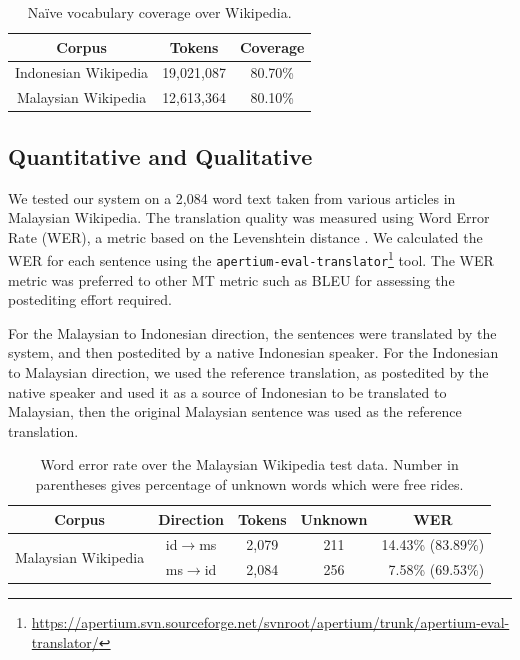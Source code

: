 \documentclass[10pt,a5paper,twoside]{article}
\begin{document}
\begin{table}[htbp]
  \begin{center}
  \begin{tabular}{ccc}
  \toprule
  \bf{Corpus} & \bf{Tokens} & \bf{Coverage}\\
  \midrule
  Indonesian Wikipedia & 19,021,087 & 80.70\% \\
  \midrule
  Malaysian Wikipedia & 12,613,364 & 80.10\% \\
  \bottomrule
  \end{tabular}
  \caption{Na\"ive vocabulary coverage over Wikipedia.}
  \label{table:coverage}
  \end{center}
\end{table}

\subsection{Quantitative and Qualitative}
We tested our system on a 2,084 word text taken from various articles in Malaysian Wikipedia. The translation quality was measured using Word Error Rate (WER), a metric based on the Levenshtein distance \citep{levenshtein/1966}. We calculated the WER for each sentence using the \texttt{\small{apertium-eval-translator}}\footnote{\url{https://apertium.svn.sourceforge.net/svnroot/apertium/trunk/apertium-eval-translator/}} tool. The WER metric was preferred to other MT metric such as BLEU \citep{Papineni2002bleu} for assessing the postediting effort required.

For the Malaysian to Indonesian direction, the sentences were translated by the system, and then postedited by a native Indonesian speaker. For the Indonesian to Malaysian direction, we used the reference translation, as postedited by the native speaker and used it as a source of Indonesian to be translated to Malaysian, then the original Malaysian sentence was used as the reference translation.

\begin{table}[htbp]
  \begin{center}
  \begin{tabular}{ccccr}
  \toprule
  \bf{Corpus}                 & \bf{Direction}         & \bf{Tokens}  & \bf{Unknown} & \multicolumn{1}{c}{\bf{WER}}  \\
  \midrule
  \multirow{2}{*}{Malaysian Wikipedia} & id$\rightarrow$ms & 2,079     & 211  & 14.43\% (83.89\%) \\
                          & ms$\rightarrow$id & 2,084     & 256  & 7.58\% (69.53\%)  \\
  \bottomrule
  \end{tabular}
    \caption{Word error rate over the Malaysian Wikipedia test data. Number in parentheses gives percentage of unknown words which were free rides.}
    \label{table:wer}
  \end{center}
\end{table}
\end{document}
